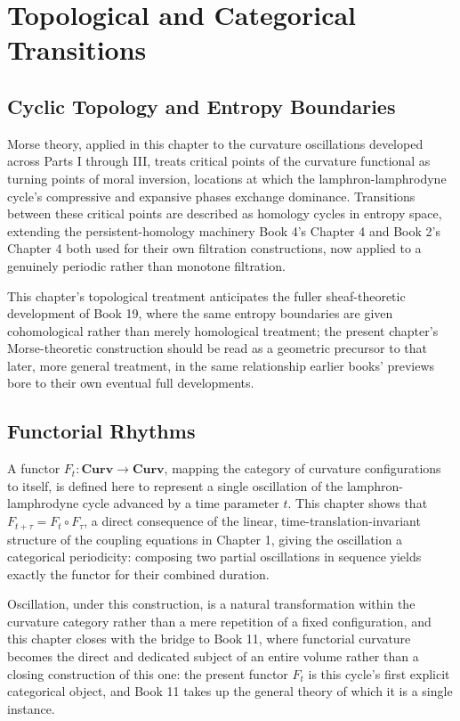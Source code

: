 \part{Topological and Categorical Transitions}

\chapter{Cyclic Topology and Entropy Boundaries}

Morse theory, applied in this chapter to the curvature oscillations developed across Parts I through III, treats critical points of the curvature functional as turning points of moral inversion, locations at which the lamphron-lamphrodyne cycle's compressive and expansive phases exchange dominance. Transitions between these critical points are described as homology cycles in entropy space, extending the persistent-homology machinery Book 4's Chapter 4 and Book 2's Chapter 4 both used for their own filtration constructions, now applied to a genuinely periodic rather than monotone filtration.

This chapter's topological treatment anticipates the fuller sheaf-theoretic development of Book 19, where the same entropy boundaries are given cohomological rather than merely homological treatment; the present chapter's Morse-theoretic construction should be read as a geometric precursor to that later, more general treatment, in the same relationship earlier books' previews bore to their own eventual full developments.

\chapter{Functorial Rhythms}

A functor $F_t : \mathbf{Curv} \to \mathbf{Curv}$, mapping the category of curvature configurations to itself, is defined here to represent a single oscillation of the lamphron-lamphrodyne cycle advanced by a time parameter $t$. This chapter shows that $F_{t+\tau} = F_t \circ F_\tau$, a direct consequence of the linear, time-translation-invariant structure of the coupling equations in Chapter 1, giving the oscillation a categorical periodicity: composing two partial oscillations in sequence yields exactly the functor for their combined duration.

Oscillation, under this construction, is a natural transformation within the curvature category rather than a mere repetition of a fixed configuration, and this chapter closes with the bridge to Book 11, where functorial curvature becomes the direct and dedicated subject of an entire volume rather than a closing construction of this one: the present functor $F_t$ is this cycle's first explicit categorical object, and Book 11 takes up the general theory of which it is a single instance.

